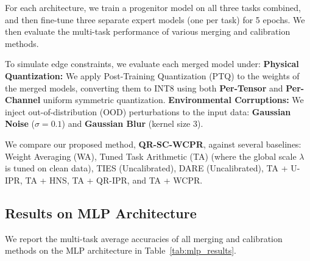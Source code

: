 \documentclass{article}
\theoremstyle{plain}
\theoremstyle{definition}
\theoremstyle{remark}
\begin{document}
For each architecture, we train a progenitor model on all three tasks combined, and then fine-tune three separate expert models (one per task) for 5 epochs. We then evaluate the multi-task performance of various merging and calibration methods.

To simulate edge constraints, we evaluate each merged model under:
\textbf{Physical Quantization:} We apply Post-Training Quantization (PTQ) to the weights of the merged models, converting them to INT8 using both \textbf{Per-Tensor} and \textbf{Per-Channel} uniform symmetric quantization.
\textbf{Environmental Corruptions:} We inject out-of-distribution (OOD) perturbations to the input data: \textbf{Gaussian Noise} ($\sigma=0.1$) and \textbf{Gaussian Blur} (kernel size 3).

We compare our proposed method, \textbf{QR-SC-WCPR}, against several baselines: Weight Averaging (WA), Tuned Task Arithmetic (TA) (where the global scale $\lambda$ is tuned on clean data), TIES (Uncalibrated), DARE (Uncalibrated), TA + U-IPR, TA + HNS, TA + QR-IPR, and TA + WCPR.

\subsection{Results on MLP Architecture}
We report the multi-task average accuracies of all merging and calibration methods on the MLP architecture in Table~\ref{tab:mlp_results}.
\end{document}
